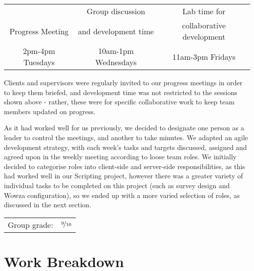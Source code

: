 \begin{table}[ht]
\centering
\begin{tabular}{c|c|c}
 					& Group discussion 		& Lab time for \\
Progress Meeting 	& and development time 	& collaborative development\\
\hline
2pm-4pm Tuesdays 	& 10am-1pm Wednesdays 	& 11am-3pm Fridays\\
\end{tabular}
\end{table}
Clients and supervisors were regularly invited to our progress meetings in order to keep them briefed, and development time was not restricted to the sessions shown above - rather, these were for specific collaborative work to keep team members updated on progress.

As it had worked well for us previously, we decided to designate one person as a leader to control the meetings, and another to take minutes. We adapted an agile development strategy, with each week's tasks and targets discussed, assigned and agreed upon in the weekly meeting according to loose team roles. We initially decided to categorise roles into client-side and server-side responsibilities, as this had worked well in our Scripting project, however there was a greater variety of individual tasks to be completed on this project (such as survey design and Wowza configuration), so we ended up with a more varied selection of roles, as discussed in the next section.

\hfill \begin{tabular}{l l}
	Group grade: & $\nicefrac{9}{10}$ \\
\end{tabular}

\section*{Work Breakdown}

